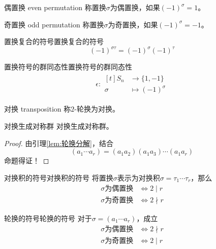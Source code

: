 \begin{definition}{偶置换 even permutation}
	称置换$\sigma$为偶置换，如果$(-1)^\sigma=1$。
\end{definition}

\begin{definition}{奇置换 odd permutation}
	称置换$\sigma$为奇置换，如果$(-1)^\sigma=-1$。
\end{definition}

\begin{lemma}{置换复合的符号}{置换复合的符号}
	$$
	(-1)^{\sigma\tau}=(-1)^{\sigma}(-1)^{\tau}
	$$
\end{lemma}

\begin{theorem}{置换符号的群同态性}{置换符号的群同态性}
	\begin{align*}
		\epsilon:\begin{aligned}[t]
			S_n&\longrightarrow \{1,-1\}\\
			\sigma&\longmapsto (-1)^\sigma
		\end{aligned}
	\end{align*}
\end{theorem}

\begin{definition}{对换 transposition}
	称$2$-轮换为对换。
\end{definition}

\begin{lemma}{}{对换生成对称群}
	对换生成对称群。
\end{lemma}

\begin{proof}
	由引理\ref{lem:轮换分解}，结合
	$$
	(a_1\cdots a_r)=(a_1a_2)(a_1a_3)\cdots(a_1a_r) 
	$$
	命题得证！
\end{proof}

\begin{lemma}{对换积的符号}{对换积的符号}
	将置换$\sigma$表示为对换积$\sigma=\tau_1\cdots \tau_r$，那么
	\begin{align*}
		\sigma\text{为偶置换}&\iff 2\mid r\\
		\sigma\text{为奇置换}&\iff 2\nmid r
	\end{align*}
\end{lemma}

\begin{lemma}{轮换的符号}{轮换的符号}
	对于$\sigma=(a_1\cdots a_r)$，成立
	\begin{align*}
		\sigma\text{为偶置换}&\iff 2\nmid r\\
		\sigma\text{为奇置换}&\iff 2\mid r
	\end{align*}
\end{lemma}


